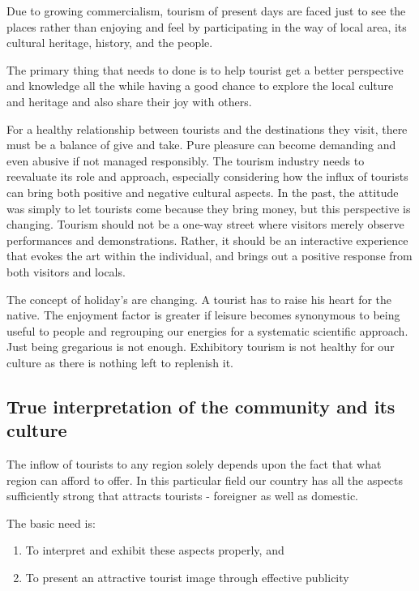Due to growing commercialism, tourism of present days are faced just to see the places rather than enjoying and feel by participating in the way of local area, its cultural heritage, history, and the people.

The primary thing that needs to done is to help tourist get a better perspective and knowledge all the while having a good chance to explore the local culture and heritage and also share their joy with others.

For a healthy relationship between tourists and the destinations they visit, there must be a balance of give and take. Pure pleasure can become demanding and even abusive if not managed responsibly. The tourism industry needs to reevaluate its role and approach, especially considering how the influx of tourists can bring both positive and negative cultural aspects. In the past, the attitude was simply to let tourists come because they bring money, but this perspective is changing. Tourism should not be a one-way street where visitors merely observe performances and demonstrations. Rather, it should be an interactive experience that evokes the art within the individual, and brings out a positive response from both visitors and locals.

The concept of holiday's are changing. A tourist has to raise his heart for the native. The enjoyment factor is greater if leisure becomes synonymous to being useful to people and regrouping our energies for a systematic scientific approach. Just being gregarious is not enough. Exhibitory tourism is not healthy for our culture as there is nothing left to replenish it.


\subsection{True interpretation of the community and its culture} %
\label{sub:tic}

The inflow of tourists to any region solely depends upon the fact that what region can afford to offer. In this particular field our country has all the aspects sufficiently strong that attracts tourists - foreigner as well as domestic.

The basic need is:

\begin{enumerate}
  \item To interpret and exhibit these aspects properly, and
  \item To present an attractive tourist image through effective publicity
\end{enumerate}


